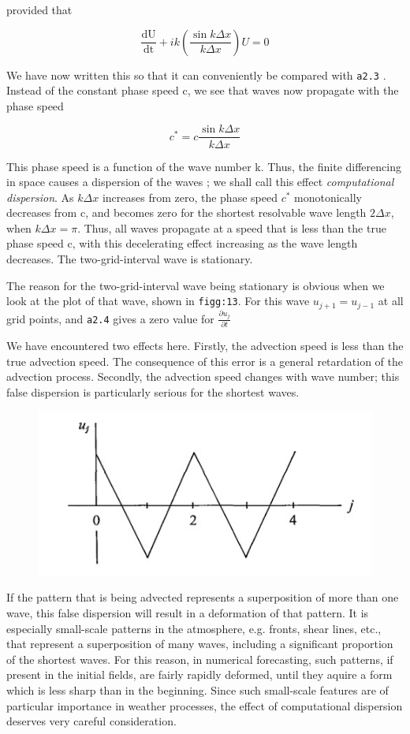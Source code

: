 provided that

 \[\frac{\text{dU}}{\text{dt}} + ik\left( \frac{\sin{k\Delta x}}{k\Delta x} \right)U = 0\]

We have now written this so that it can conveniently be compared with
\texttt{a2.3} . Instead of the constant phase speed c, we see that waves
now propagate with the phase speed

 \[c^{*} = c\frac{\sin{k\Delta x}}{k\Delta x}\]

This phase speed is a function of the wave number k. Thus, the finite
differencing in space causes a dispersion of the waves ; we shall call
this effect \emph{computational dispersion}. As \(k\Delta x\) increases
from zero, the phase speed \(c^{*}\) monotonically decreases from c, and
becomes zero for the shortest resolvable wave length \(2\Delta x\), when
\(k\Delta x = \pi\). Thus, all waves propagate at a speed that is less
than the true phase speed c, with this decelerating effect increasing as
the wave length decreases. The two-grid-interval wave is stationary.

The reason for the two-grid-interval wave being stationary is obvious
when we look at the plot of that wave, shown in \texttt{figg:13}. For
this wave \(u_{j + 1} = u_{j - 1}\) at all grid points, and
\texttt{a2.4} gives a zero value for
\(\frac{{\partial u}_{j}}{\partial t}\)

We have encountered two effects here. Firstly, the advection speed is
less than the true advection speed. The consequence of this error is a
general retardation of the advection process. Secondly, the advection
speed changes with wave number; this false dispersion is particularly
serious for the shortest waves.

\begin{figure}
 \centering
 \includegraphics[width = .7 \textwidth]{figs/NM/pic13.jpg}
 \caption{} \label{fig:}
\end{figure}

If the pattern that is being advected represents a superposition of
more than one wave, this false dispersion will result in a deformation
of that pattern. It is especially small-scale patterns in the
atmosphere, e.g. fronts, shear lines, etc., that represent a
superposition of many waves, including a significant proportion of the
shortest waves. For this reason, in numerical forecasting, such
patterns, if present in the initial fields, are fairly rapidly deformed,
until they aquire a form which is less sharp than in the beginning.
Since such small-scale features are of particular importance in weather
processes, the effect of computational dispersion deserves very careful
consideration.

